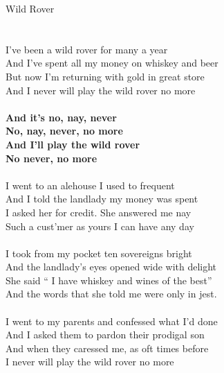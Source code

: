 \documentclass[letterpaper,9pt]{article}
\begin{document}
\newpage
{}
\huge
Wild Rover\\
\\
\LARGE
\\I’ve been a wild rover for many a year
\\And I’ve spent all my money on whiskey and beer
\\But now I’m returning with gold in great store
\\And I never will play the wild rover no more
\\
\\\textbf{And it’s no, nay, never
\\No, nay, never, no more
\\And I’ll play the wild rover 
\\No never, no more}
\\
\\I went to an alehouse I used to frequent
\\And I told the landlady my money was spent
\\I asked her for credit. She answered me nay
\\Such a cust’mer as yours I can have any day
\\
\\I took from my pocket ten sovereigns bright
\\And the landlady’s eyes opened wide with delight
\\She said “ I have whiskey and wines of the best”
\\And the words that she told me were only in jest.
\\
\\I went to my parents and confessed what I’d done
\\And I asked them to pardon their prodigal son
\\And when they caressed me, as oft times before
\\I never will play the wild rover no more
\end{document}
